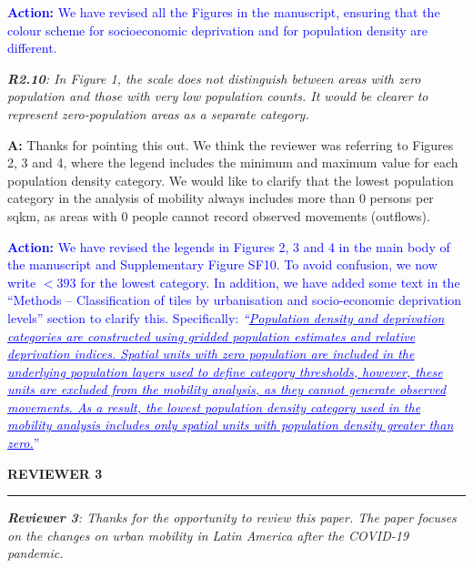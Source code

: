 \documentclass[12pt,a4paper,oneside, reqno]{amsart}
\begin{document}
\setlength{\leftskip}{1cm}\textcolor{blue}{
\textbf{Action:} We have revised all the Figures in the manuscript, ensuring that the colour scheme for socioeconomic deprivation and for population density are different.
}

\setlength{\leftskip}{0cm} \textit{\textbf{R2.10}: In Figure 1, the scale does not distinguish between areas with zero population and those with very low population counts. It would be clearer to represent zero-population areas as a separate category.}

\setlength{\leftskip}{1cm}\textbf{A:} Thanks for pointing this out. We think the reviewer was referring to Figures 2, 3 and 4, where the legend includes the minimum and maximum value for each population density category. We would like to clarify that the lowest population category in the analysis of mobility always includes more than 0 persons per sqkm, as areas with 0 people cannot record observed movements (outflows).

\textcolor{blue}{
\textbf{Action:} We have revised the legends in Figures 2, 3 and 4 in the main body of the manuscript and Supplementary Figure SF10. To avoid confusion, we now write $<393$ for the lowest category. In addition, we have added some text in the ``Methods – Classification of tiles by urbanisation and socio-economic deprivation levels'' section to clarify this. Specifically: \textit{``\ul{Population density and deprivation categories are constructed using gridded population estimates and relative deprivation indices. Spatial units with zero population are included in the underlying population layers used to define category thresholds, however, these units are excluded from the mobility analysis, as they cannot generate observed movements. As a result, the lowest population density category used in the mobility analysis includes only spatial units with population density greater than zero.}}''
}

\vspace{10pt}

\setlength{\leftskip}{0cm} \textbf{REVIEWER 3}
\vspace{-16pt}
\begin{center}
    \rule{\textwidth}{.1pt}
\end{center}

\vspace{5pt}

\setlength{\leftskip}{0cm} \textit{\textbf{Reviewer 3}: Thanks for the opportunity to review this paper. The paper focuses on the changes on urban mobility in Latin America after the COVID-19 pandemic.}
\end{document}
